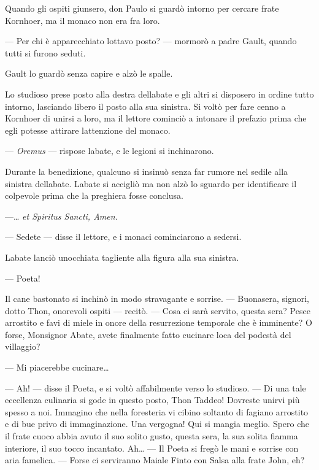 Quando gli ospiti giunsero, don Paulo si guardò intorno per cercare
frate Kornhoer, ma il monaco non era fra loro.

--- Per chi è apparecchiato l\textquotesingle ottavo posto? --- mormorò
a padre Gault, quando tutti si furono seduti.

Gault lo guardò senza capire e alzò le spalle.

Lo studioso prese posto alla destra dell\textquotesingle abate e gli
altri si disposero in ordine tutto intorno, lasciando libero il posto
alla sua sinistra. Si voltò per fare cenno a Kornhoer di unirsi a loro,
ma il lettore cominciò a intonare il prefazio prima che egli potesse
attirare l\textquotesingle attenzione del monaco.

--- \emph{Oremus} --- rispose l\textquotesingle abate, e le legioni si
inchinarono.

Durante la benedizione, qualcuno si insinuò senza far rumore nel sedile
alla sinistra dell\textquotesingle abate. L\textquotesingle abate si
accigliò ma non alzò lo sguardo per identificare il colpevole prima che
la preghiera fosse conclusa.

---\ldots{} \emph{et Spiritus Sancti, Amen.}

--- Sedete --- disse il lettore, e i monaci cominciarono a sedersi.

L\textquotesingle abate lanciò un\textquotesingle occhiata tagliente
alla figura alla sua sinistra.

--- Poeta!

Il cane bastonato si inchinò in modo stravagante e sorrise. ---
Buonasera, signori, dotto Thon, onorevoli ospiti --- recitò. --- Cosa ci
sarà servito, questa sera? Pesce arrostito e favi di miele in onore
della resurrezione temporale che è imminente? O forse, Monsignor Abate,
avete finalmente fatto cucinare l\textquotesingle oca del podestà del
villaggio?

--- Mi piacerebbe cucinare\ldots{}

--- Ah! --- disse il Poeta, e si voltò affabilmente verso lo studioso.
--- Di una tale eccellenza culinaria si gode in questo posto, Thon
Taddeo! Dovreste unirvi più spesso a noi. Immagino che nella foresteria
vi cibino soltanto di fagiano arrostito e di bue privo di immaginazione.
Una vergogna! Qui si mangia meglio. Spero che il frate cuoco abbia avuto
il suo solito gusto, questa sera, la sua solita fiamma interiore, il suo
tocco incantato. Ah\ldots{} --- Il Poeta si fregò le mani e sorrise con
aria famelica. --- Forse ci serviranno Maiale Finto con Salsa alla frate
John, eh?

